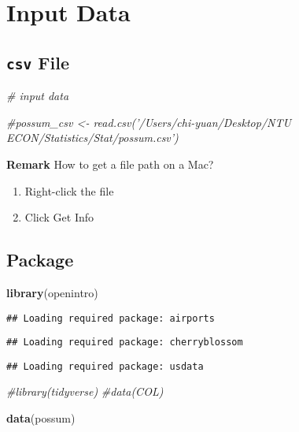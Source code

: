 \documentclass[
]{book}
\newenvironment{Shaded}{\begin{snugshade}}{\end{snugshade}}
\newcommand{\CommentTok}[1]{\textcolor[rgb]{0.56,0.35,0.01}{\textit{#1}}}
\newcommand{\KeywordTok}[1]{\textcolor[rgb]{0.13,0.29,0.53}{\textbf{#1}}}
\newcommand{\NormalTok}[1]{#1}
\begin{document}
\hypertarget{input-data}{%
\section{Input Data}\label{input-data}}

\hypertarget{csv-file}{%
\subsection{\texorpdfstring{\texttt{csv} File}{csv File}}\label{csv-file}}

\begin{Shaded}
\begin{Highlighting}[]
\CommentTok{# input data}

\CommentTok{#possum_csv <- read.csv('/Users/chi-yuan/Desktop/NTU ECON/Statistics/Stat/possum.csv')}
\end{Highlighting}
\end{Shaded}

\textbf{Remark} How to get a file path on a Mac?

\begin{enumerate}
\def\labelenumi{\arabic{enumi}.}
\item
  Right-click the file
\item
  Click Get Info
\end{enumerate}

\hypertarget{package}{%
\subsection{Package}\label{package}}

\begin{Shaded}
\begin{Highlighting}[]
\KeywordTok{library}\NormalTok{(openintro)}
\end{Highlighting}
\end{Shaded}

\begin{verbatim}
## Loading required package: airports
\end{verbatim}

\begin{verbatim}
## Loading required package: cherryblossom
\end{verbatim}

\begin{verbatim}
## Loading required package: usdata
\end{verbatim}

\begin{Shaded}
\begin{Highlighting}[]
\CommentTok{#library(tidyverse)}
\CommentTok{#data(COL)}

\KeywordTok{data}\NormalTok{(possum)}
\end{Highlighting}
\end{Shaded}
\end{document}
